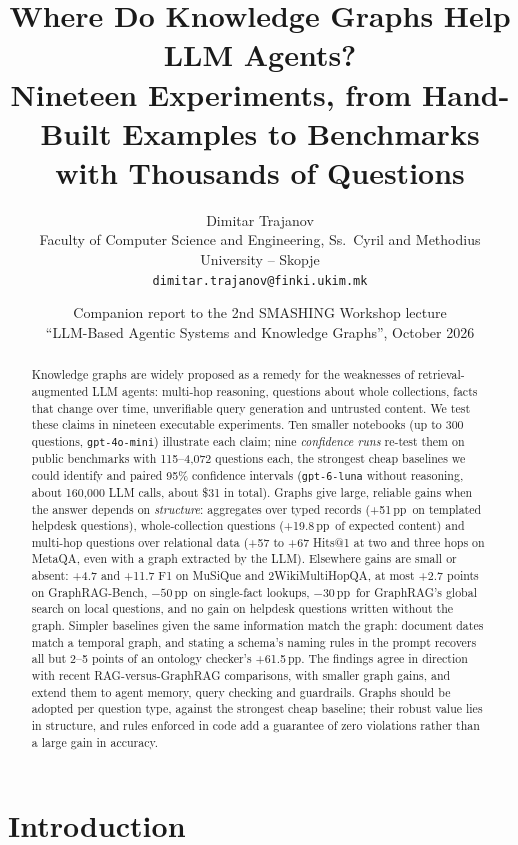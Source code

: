 \documentclass[11pt,a4paper]{article}
\title{Where Do Knowledge Graphs Help LLM Agents?\\[2pt]
\large Nineteen Experiments, from Hand-Built Examples to Benchmarks with Thousands of Questions}
\author{Dimitar Trajanov\\
\small Faculty of Computer Science and Engineering, Ss.\ Cyril and Methodius University -- Skopje\\
\small \texttt{dimitar.trajanov@finki.ukim.mk}}
\date{Companion report to the 2nd SMASHING Workshop lecture\\ ``LLM-Based Agentic Systems and Knowledge Graphs'', October 2026}
\newcommand{\pp}{\,pp}
\begin{document}
\maketitle

\begin{abstract}
Knowledge graphs are widely proposed as a remedy for the weaknesses of retrieval-augmented LLM agents: multi-hop
reasoning, questions about whole collections, facts that change over time, unverifiable query generation and
untrusted content. We test these claims in nineteen executable experiments. Ten smaller notebooks
(up to 300 questions, \texttt{gpt-4o-mini}) illustrate each claim; nine \emph{confidence runs} re-test them on
public benchmarks with 115--4{,}072 questions each, the strongest cheap baselines we could identify and paired 95\%
confidence intervals (\texttt{gpt-6-luna} without reasoning, about 160{,}000 LLM calls, about \$31 in total). Graphs
give large, reliable gains when the answer depends on \emph{structure}: aggregates over typed records (+51\pp\ on
templated helpdesk questions), whole-collection questions (+19.8\pp\ of expected content) and multi-hop questions over
relational data (+57 to +67 Hits@1 at two and three hops on MetaQA, even with a graph extracted by the LLM). Elsewhere
gains are small or absent: +4.7 and +11.7 F1 on MuSiQue and 2WikiMultiHopQA, at most +2.7 points on GraphRAG-Bench,
$-50$\pp\ on single-fact lookups, $-30$\pp\ for GraphRAG's global search on local questions, and no gain on helpdesk
questions written without the graph. Simpler baselines given the same information match the graph: document dates
match a temporal graph, and stating a schema's naming rules in the prompt recovers all but 2--5 points of an ontology
checker's +61.5\pp. The findings agree in direction with recent RAG-versus-GraphRAG comparisons, with smaller graph
gains, and extend them to agent memory, query checking and guardrails. Graphs should be adopted per question type,
against the strongest cheap baseline; their robust value lies in structure, and rules enforced in code add a guarantee
of zero violations rather than a large gain in accuracy.
\end{abstract}

\section{Introduction}
\end{document}
